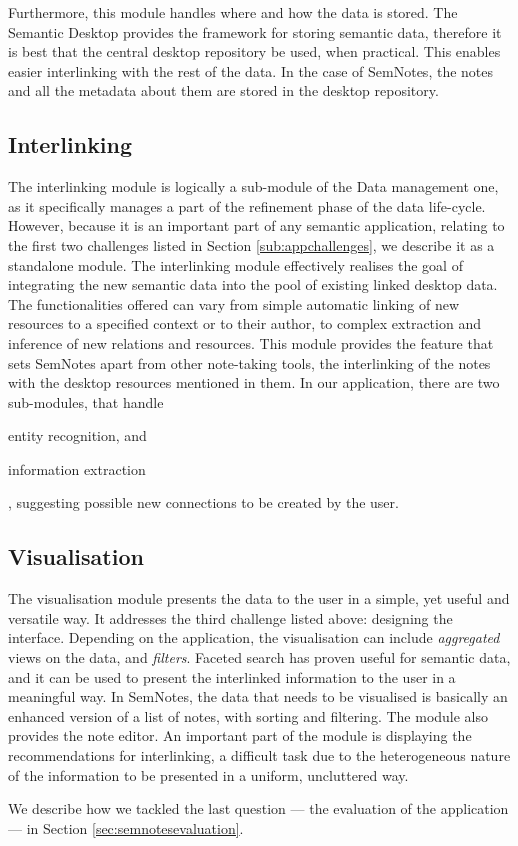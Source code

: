 Furthermore, this module handles where and how the data is stored. The Semantic Desktop provides the framework for storing semantic data, therefore it is best that the central desktop repository be used, when practical. This enables easier interlinking with the rest of the data. In the case of SemNotes, the notes and all the metadata about them are stored in the desktop repository. 

\subsection{Interlinking} 

The interlinking module is logically a sub-module of the Data management one, as it specifically manages a part of the refinement phase of the data life-cycle. However, because it is an important part of any semantic application, relating to the first two challenges listed in Section \ref{sub:appchallenges}, we describe it as a standalone module. The interlinking module effectively realises the goal of integrating the new semantic data into the pool of existing linked desktop data. The functionalities offered can vary from simple automatic linking of new resources to a specified context or to their author, to complex extraction and inference of new relations and resources.  This module provides the feature that sets SemNotes apart from other note-taking tools, the interlinking of the notes with the desktop resources mentioned in them. In our application, there are two sub-modules, that handle \begin{inparaenum}[(i)] \item entity recognition, and \item information extraction\end{inparaenum}, suggesting 
possible new connections to be created by the user.
 
\subsection{Visualisation} 

The visualisation module presents the data to the user in a simple, yet useful and versatile way. It addresses the third challenge listed above: designing the interface. Depending on the application, the visualisation can include \emph{aggregated} views on the data, and \emph{filters}. Faceted search \cite{Yee2003} has proven useful for semantic data, and it can be used to present the interlinked information to the user in a meaningful way. In SemNotes, the data that needs to be visualised is basically an enhanced version of a list of notes, with sorting and filtering. The module also provides the note editor. An important part of the module is displaying the recommendations for interlinking, a difficult task due to the heterogeneous nature of the information to be presented in a uniform, uncluttered way.

We describe how we tackled the last question --- the evaluation of the application --- in Section \ref{sec:semnotesevaluation}. 

